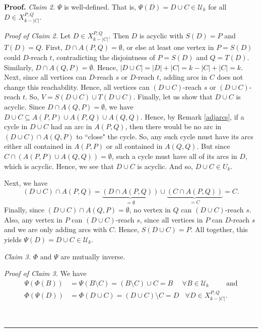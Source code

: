 \documentclass[numbers=enddot,12pt,final,onecolumn,notitlepage]{scrartcl}%
\theoremstyle{definition}
\newenvironment{proof}[1][Proof]{\noindent\textbf{#1.} }{\ \rule{0.5em}{0.5em}}
\theoremstyle{plainsl}
\begin{document}
\begin{proof}
\bigskip
\textit{Claim 2.} $\Psi$ is well-defined. That is, $\Psi(D) = D \cup C \in \mathcal{U}_{k}$ for all $D \in X_{k-|C|}^{P,Q}$.

\smallskip
\textit{Proof of Claim 2.} Let $D \in X_{k-|C|}^{P,Q}$. Then $D$ is acyclic with $S(D) = P$ and $T(D) = Q$.  First, $D \cap A(P,Q) = \emptyset$, or else at least one vertex in $P = S(D)$ could $D$-reach $t$, contradicting the disjointness of $P = S(D)$ and $Q = T(D)$. Similarly, $D \cap A(Q,P) = \emptyset$. Hence, $|D \cup C| = |D| + |C| = k-|C|+|C| = k$. Next, since all vertices can $D$-reach $s$ or $D$-reach $t$, adding arcs in $C$ does not change this reachability. Hence, all vertices can $(D \cup C)$-reach $s$ or $(D \cup C)$-reach $t$. So, $V = S(D \cup C) \cup T(D \cup C)$. Finally, let us show that $D \cup C$ is acyclic. Since $D \cap A(Q,P) = \emptyset$, we have $D \cup C \subseteq A(P,P) \cup A(P,Q) \cup A(Q,Q)$. Hence, by Remark \ref{adjarcs}, if a cycle in $D \cup C$ had an arc in $A(P,Q)$, then there would be no arc in $(D \cup C) \cap A(Q,P)$ to ``close" the cycle. So, any such cycle must have its arcs either all contained in $A(P,P)$ or all contained in $A(Q,Q)$. But since $C \cap (A(P,P) \cup A(Q,Q)) = \emptyset$, such a cycle must have all of its arcs in $D$, which is acyclic. Hence, we see that $D \cup C$ is acyclic. And so, $D \cup C \in U_{k}$.

Next, we have \begin{equation*}
    (D \cup C) \cap A(P,Q) = \underbrace{(D \cap A(P,Q))}_{=\emptyset} \cup \underbrace{(C \cap A(P,Q))}_{=C} = C.
\end{equation*} Finally, since $(D \cup C) \cap A(Q,P) = \emptyset$, no vertex in $Q$ can $(D \cup C)$-reach $s$. Also, any vertex in $P$ can $(D \cup C)$-reach $s$, since all vertices in $P$ can $D$-reach $s$ and we are only adding arcs with $C$. Hence, $S(D\cup C)= P$. All together, this yields $\Psi(D) = D \cup C \in \mathcal{U}_{k}$.

\bigskip
\textit{Claim 3.} $\Phi$ and $\Psi$ are mutually inverse.

\smallskip
\textit{Proof of Claim 3.} We have \begin{align*}
    \Psi(\Phi(B)) &= \Psi(B \setminus C) = (B \setminus C) \cup C = B \ \ \ \ \ \  \forall B \in \mathcal{U}_{k} \ \ \ \ \ \ \ \ \ \ \ \text{and} \\
    \Phi(\Psi(D)) &= \Phi(D \cup C) = (D \cup C) \setminus C = D \ \ \ \ \forall D \in X_{k-|C|}^{P,Q}.
\end{align*}


\end{proof}
\end{document}
